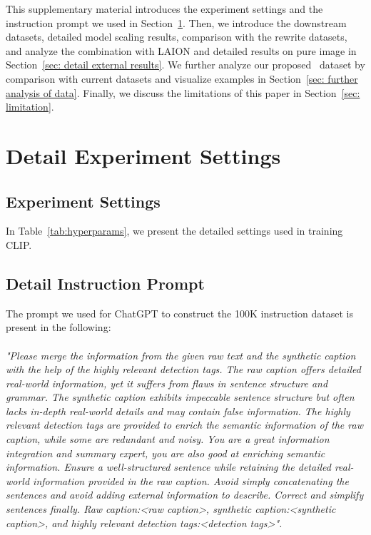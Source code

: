 \appendix


This supplementary material introduces the experiment settings and the instruction prompt we used in Section~\ref{sec: detail experiment settings}. Then, we introduce the downstream datasets, detailed model scaling results, comparison with the rewrite datasets, and analyze the combination \dsname with LAION and detailed results on pure image in Section~\ref{sec: detail external results}. We further analyze our proposed \dsname\ dataset by comparison with current datasets and visualize examples in Section~\ref{sec: further analysis of data}. Finally, we discuss the limitations of this paper in Section~\ref{sec: limitation}.

\section{Detail Experiment Settings}
\label{sec: detail experiment settings}

\subsection{Experiment Settings}
In Table~\ref{tab:hyperparams}, we present the detailed settings used in training CLIP.


\subsection{Detail Instruction Prompt}
The prompt we used for ChatGPT to construct the 100K instruction dataset is present in the following:
\\
\\
\emph{"Please merge the information from the given raw text and the synthetic caption with the help of the highly relevant detection tags. The raw caption offers detailed real-world information, yet it suffers from flaws in sentence structure and grammar. The synthetic caption exhibits impeccable sentence structure but often lacks in-depth real-world details and may contain false information. The highly relevant detection tags are provided to enrich the semantic information of the raw caption, while some are redundant and noisy. You are a great information integration and summary expert, you are also good at enriching semantic information. Ensure a well-structured sentence while retaining the detailed real-world information provided in the raw caption. Avoid simply concatenating the sentences and avoid adding external information to describe. Correct and simplify sentences finally. Raw caption:\textless raw caption\textgreater, synthetic caption:\textless synthetic caption\textgreater, and highly relevant detection tags:\textless detection tags\textgreater".}

